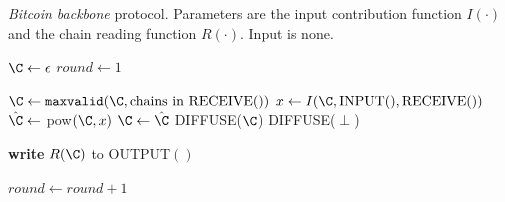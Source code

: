 \documentclass[..]{subfiles}
\begin{document}
\begin{algorithm}
	\caption{\textit{Bitcoin backbone} protocol. Parameters are the input contribution function $I(\cdot)$ and the chain reading function $R(\cdot)$. Input is none.}\label{backbone}
\begin{algorithmic}[1]
	\State $\C \gets \epsilon$
	\State $round \gets 1$

	\State 
		\State $\C \gets \texttt{maxvalid}(\C, \textrm{chains in RECEIVE$()$})$
		\State $x \gets I(\C, \textrm{INPUT}(), \textrm{RECEIVE}())$
		\State $\hat\C \gets$ pow$(\C, x)$
		\If{$\C \neq \hat\C$}
			\State $\C \gets \hat\C$
			\State DIFFUSE($\C$)
		\Else
			\State DIFFUSE($\perp$)
		\EndIf

	\State
		\State \textbf{write} $R(\C)$ to OUTPUT$()$
	\EndIf

	\State
	\State $round \gets round + 1$
	\EndWhile
	\EndFunction
\end{algorithmic}
\end{algorithm}
\end{document}
